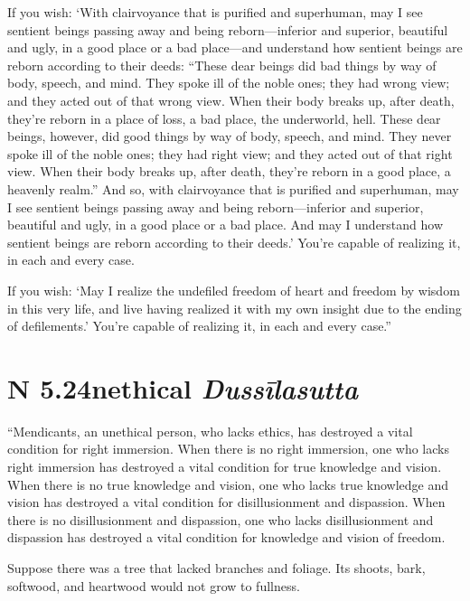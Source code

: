 \documentclass[12pt,openany]{book}%
\newcommand*{\suttatitleacronym}[1]{\smaller[2]{#1}\vspace*{.3em}}
\newcommand*{\suttatitletranslation}[1]{\linebreak{#1}}
\newcommand*{\suttatitleroot}[1]{\linebreak\smaller[2]\itshape{#1}}
\newcommand*{\tocacronym}[1]{\hspace*{-3.3em}{#1}\quad}
\newcommand*{\toctranslation}[1]{#1}
\newcommand*{\tocroot}[1]{(\textit{#1})}
\begin{document}
If you wish: ‘With clairvoyance that is purified and superhuman, may I see sentient beings passing away and being reborn—inferior and superior, beautiful and ugly, in a good place or a bad place—and understand how sentient beings are reborn according to their deeds: “These dear beings did bad things by way of body, speech, and mind. They spoke ill of the noble ones; they had wrong view; and they acted out of that wrong view. When their body breaks up, after death, they’re reborn in a place of loss, a bad place, the underworld, hell. These dear beings, however, did good things by way of body, speech, and mind. They never spoke ill of the noble ones; they had right view; and they acted out of that right view. When their body breaks up, after death, they’re reborn in a good place, a heavenly realm.” And so, with clairvoyance that is purified and superhuman, may I see sentient beings passing away and being reborn—inferior and superior, beautiful and ugly, in a good place or a bad place. And may I understand how sentient beings are reborn according to their deeds.’ You’re capable of realizing it, in each and every case. 

If you wish: ‘May I realize the undefiled freedom of heart and freedom by wisdom in this very life, and live having realized it with my own insight due to the ending of defilements.’ You’re capable of realizing it, in each and every case.” 

%
\section*{{\suttatitleacronym AN 5.24}{\suttatitletranslation Unethical }{\suttatitleroot Dussīlasutta}}
\addcontentsline{toc}{section}{\tocacronym{AN 5.24} \toctranslation{Unethical } \tocroot{Dussīlasutta}}

“Mendicants, an unethical person, who lacks ethics, has destroyed a vital condition for right immersion. When there is no right immersion, one who lacks right immersion has destroyed a vital condition for true knowledge and vision. When there is no true knowledge and vision, one who lacks true knowledge and vision has destroyed a vital condition for disillusionment and dispassion. When there is no disillusionment and dispassion, one who lacks disillusionment and dispassion has destroyed a vital condition for knowledge and vision of freedom. 

Suppose there was a tree that lacked branches and foliage. Its shoots, bark, softwood, and heartwood would not grow to fullness. 
\end{document}
